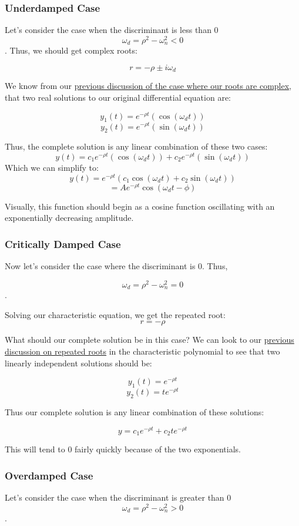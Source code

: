 \documentclass{report}
\begin{document}
\subsubsection{Underdamped Case}
Let's consider the case when the discriminant is less than 0 
$$\omega_d = \rho^2-\omega_n^2 < 0$$.
Thus, we should get complex roots:

$$r = -\rho \pm i\omega_d$$

We know from our \hyperref[th:realFromComplex]{previous discussion of the case where our roots are complex}, that two real solutions to our original differential equation are:

$$y_1(t) = e^{-\rho t}(\cos(\omega_d t))$$
$$y_2(t) = e^{-\rho t}(\sin(\omega_d t))$$

Thus, the complete solution is any linear combination of these two cases:
$$y(t) = c_1e^{-\rho t}(\cos(\omega_d t)) + c_2e^{-\rho t}(\sin(\omega_d t))$$
Which we can simplify to:
$$y(t) = e^{-\rho t}(c_1\cos(\omega_d t) + c_2\sin(\omega_d t))$$
$$=Ae^{-\rho t}\cos(\omega_d t - \phi)$$

Visually, this function should begin as a cosine function oscillating with an exponentially decreasing amplitude.


\subsubsection{Critically Damped Case}
Now let's consider the case where the discriminant is 0. Thus,

$$\omega_d = \rho^2-\omega_n^2 = 0$$.

Solving our characteristic equation, we get the repeated root:
$$r = -\rho$$

What should our complete solution be in this case? We can look to our \hyperref[th:linIndRep]{previous discussion on repeated roots} in the characteristic polynomial to see that two linearly independent solutions should be:


$$y_1(t) = e^{-\rho t}$$
$$y_2(t) = te^{-\rho t}$$

Thus our complete solution is any linear combination of these solutions:

$$y = c_1e^{-\rho t} + c_2te^{-\rho t} $$


This will tend to 0 fairly quickly because of the two exponentials.


\subsubsection{Overdamped Case}
Let's consider the case when the discriminant is greater than 0 
$$\omega_d = \rho^2-\omega_n^2 > 0$$.
\end{document}
